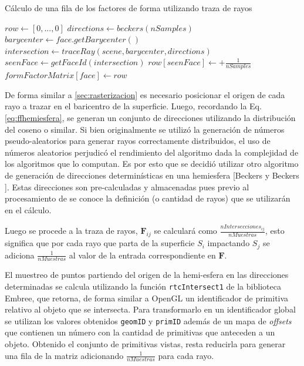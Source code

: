 \begin{algorithm}
	\caption{Cálculo de una fila de los factores de forma utilizando traza de rayos}
	\label{alg:computeff}
	\begin{algorithmic}
			\State $row \gets [0,...,0]$
			\State $directions \gets beckers(nSamples)$
			\State $barycenter \gets face.getBarycenter()$
			\State $intersection \gets traceRay(scene, barycenter, directions)$
			\State $seenFace \gets getFaceId(intersection)$
			\State $row[seenFace] \gets + \frac{1}{nSamples}$
			\EndIf
			\EndLoop
			\State $formFactorMatrix[face] \gets  row$
		\EndFunction
	\end{algorithmic}
\end{algorithm}

De forma similar a \ref{sec:rasterizacion} es necesario posicionar el origen de cada rayo a trazar en el baricentro de la superficie. Luego, recordando la Eq. \eqref{eq:ffhemiesfera}, se generan un conjunto de direcciones utilizando la distribución del coseno o similar. Si bien originalmente se utilizó la generación de números pseudo-aleatorios para generar rayos correctamente distribuidos, el uso de números aleatorios perjudicó el rendimiento del algoritmo dada la complejidad de los algoritmos que lo computan. Es por esto que se decidió utilizar otro algoritmo de generación de direcciones determinísticas en una hemiesfera [Beckers y Beckers \cite{Beckers}]. Estas direcciones son pre-calculadas y almacenadas pues previo al procesamiento de se conoce la definición (o cantidad de rayos) que se utilizarán en el cálculo.

Luego se procede a la traza de rayos, $\mathbf{F}_{ij}$ se calculará como $\frac{nIntersecciones_{ij}}{nMuestras}$, esto significa que por cada rayo que parta de la superficie $S_{i}$ impactando $S_{j}$ se adiciona $\frac{1}{nMuestras}$ al valor de la entrada correspondiente en $\mathbf{F}$.

El muestreo de puntos partiendo del origen de la hemi-esfera en las direcciones determinadas se calcula utilizando la función \verb|rtcIntersect1| de la biblioteca Embree, que retorna, de forma similar a OpenGL un identificador de primitiva relativo al objeto que se intersecta. Para transformarlo en un identificador global se utilizan los valores obtenidos \verb|geomID| y \verb|primID| además de un mapa de \textit{offsets} que contienen un número con la cantidad de primitivas que anteceden a un objeto. Obtenido el conjunto de primitivas vistas, resta reducirla para generar una fila de la matriz adicionando $\frac{1}{nMuestras}$ para cada rayo.

